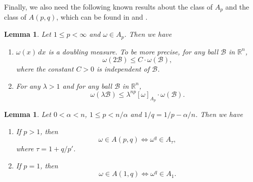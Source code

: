 \documentclass[preprint,10pt]{elsarticle}
\newtheorem{lem}[thm]{Lemma}
\numberwithin{equation}{section}
\begin{document}
Finally, we also need the following known results about the class of $A_p$ and the class of $A(p,q)$,
which can be found in \cite[Chapter 7]{grafakos} and \cite[Chapter 3]{lu}.
\begin{lem}\label{lem4}
Let $1\leq p<\infty$ and $\omega\in A_p$. Then we have
\begin{enumerate}
  \item $\omega(x)\,dx$ is a doubling measure. To be more precise, for any ball $\mathcal{B}$ in $\mathbb R^n$,
\begin{equation*}
\omega(2\mathcal{B})\leq C\cdot\omega(\mathcal{B}),
\end{equation*}
where the constant $C>0$ is independent of $\mathcal{B}$.
  \item For any $\lambda>1$ and for any ball $\mathcal{B}$ in $\mathbb R^n$,
\begin{equation*}
\omega(\lambda\mathcal{B})\leq \lambda^{np}[\omega]_{A_p}\cdot\omega(\mathcal{B}).
\end{equation*}
\end{enumerate}
\end{lem}

\begin{lem}\label{lem5}
Let $0<\alpha<n$, $1\leq p<n/{\alpha}$ and $1/q=1/p-{\alpha}/n$. Then we have
\begin{enumerate}
  \item If $p>1$, then
\begin{equation*}
\omega\in A(p,q)\Longleftrightarrow \omega^q\in A_{\tau},
\end{equation*}
where $\tau=1+q/{p'}$.
  \item If $p=1$, then
\begin{equation*}
\omega\in A(1,q)\Longleftrightarrow \omega^q\in A_1.
\end{equation*}
\end{enumerate}
\end{lem}
\end{document}
